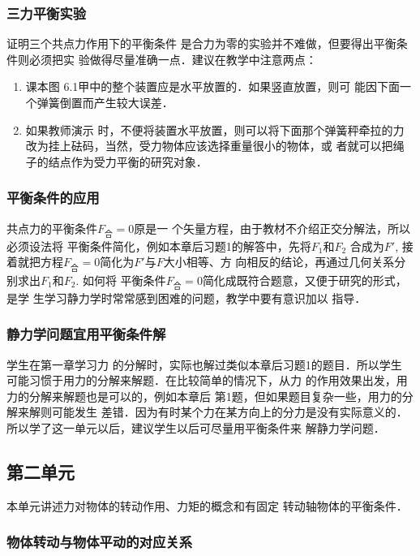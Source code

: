 \subsubsection{三力平衡实验}

证明三个共点力作用下的平衡条件
是合力为零的实验并不难做，但要得出平衡条件则必须把实
验做得尽量准确一点．建议在教学中注意两点：
\begin{enumerate}
\item 课本图
6.1甲中的整个装置应是水平放置的．如果竖直放置，则可
能因下面一个弹簧倒置而产生较大误差．    
\item 如果教师演示
时，不便将装置水平放置，则可以将下面那个弹簧秤牵拉的力
改为挂上砝码，当然，受力物体应该选择重量很小的物体，或
者就可以把绳子的结点作为受力平衡的研究对象．
\end{enumerate}

\subsubsection{平衡条件的应用}

共点力的平衡条件$F_{\text{合}}=0$原是一
个矢量方程，由于教材不介绍正交分解法，所以必须设法将
平衡条件简化，例如本章后习题1的解答中，先将$F_1$和$F_2$
合成为$F'$, 接着就把方程$F_{\text{合}}=0$简化为$F'$与$F$大小相等、方
向相反的结论，再通过几何关系分别求出$F_1$和$F_2$. 如何将
平衡条件$F_{\text{合}}=0$简化成既符合题意，又便于研究的形式，是学
生学习静力学时常常感到困难的问题，教学中要有意识加以
指导．

\subsubsection{静力学问题宜用平衡条件解}

学生在第一章学习力
的分解时，实际也解过类似本章后习题1的题目．所以学生
可能习惯于用力的分解来解题．在比较简单的情况下，从力
的作用效果出发，用力的分解来解题也是可以的，例如本章后
第1题，但如果题目复杂一些，用力的分解来解则可能发生
差错．因为有时某个力在某方向上的分力是没有实际意义的．
所以学了这一单元以后，建议学生以后可尽量用平衡条件来
解静力学问题．


\subsection{第二单元}
本单元讲述力对物体的转动作用、力矩的概念和有固定
转动轴物体的平衡条件．
\subsubsection{物体转动与物体平动的对应关系}

